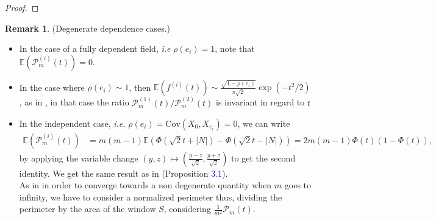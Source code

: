 \documentclass[12pt]{article}
\theoremstyle{Theorem}
\theoremstyle{definition}
\newtheorem{remark}{Remark}
\begin{document}
\begin{proof}
\end{proof}
\begin{remark}(Degenerate dependence cases.)
\label{casdegenerer}
\begin{itemize}
\item In the case of a fully dependent field, \textit{i.e}  $\rho(e_i) = 1$, note that $\mathbb{E}\left(\mathcal{P}_{m}^{\scriptscriptstyle (i)}(t) \right) = 0$.
\item In the case where $\rho(e_i) \sim 1$, then $\mathbb{E}\left(f^{(i)}(t) \right) \sim \frac{\sqrt{1-\rho(e_i)}}{\pi\sqrt{2}} \exp(-t^2/2)$, as in \cite{HermineAgnes}, in that case the ratio $\mathcal{P}^{\scriptscriptstyle (1)}_{m}(t)/\mathcal{P}^{\scriptscriptstyle (2)}_{m}(t)$ is invariant in regard to $t$
\item In the independent case, \textit{i.e.} $\rho(e_{i}) = \text{Cov}\left(X_{0}, X_{e_i}\right) = 0$, we can write
{\small
\begin{align*}
\mathbb{E}\left(\mathcal{P}^{\scriptscriptstyle  (i)}_{m}(t) \right) & = m(m-1)\mathbb{E}\left(\Phi\left(\sqrt{2}t + |N|\right) - \Phi\left(\sqrt{2}t - |N|\right)\right) = 2m(m-1)\Phi(t)\left(1-\Phi(t)\right), 
\end{align*}}by applying the variable change $ (y, z) \mapsto (\frac{y-z}{\sqrt{2}}, \frac{y+z}{\sqrt{2}})$ to get the second identity. We get the same result as in \cite{Psymetrie} (Proposition \textcolor{blue}{3.1}). \\ As in \cite{Psymetrie} in order to converge towards a non degenerate quantity when $m$ goes to infinity, we have to consider a normalized perimeter thus, dividing the perimeter by the area of the window $S$, considering $\frac{1}{m^2}\mathcal{P}_{m}(t)$.
\end{itemize}
\end{remark}
\end{document}
